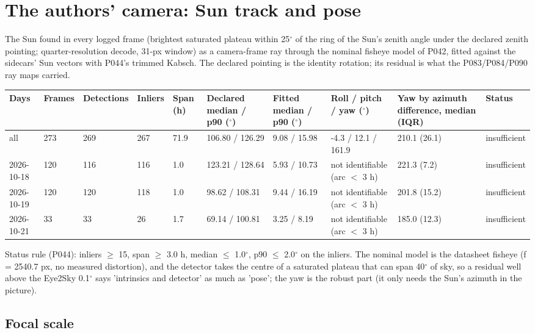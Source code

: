 \section{The authors' camera: Sun track and pose}

The Sun found in every logged frame (brightest saturated plateau within 25$^\circ$ of the ring of the Sun's zenith angle under the declared zenith pointing; quarter-resolution decode, 31-px window) as a camera-frame ray through the nominal fisheye model of P042, fitted against the sidecars' Sun vectors with P044's trimmed Kabsch. The declared pointing is the identity rotation; its residual is what the P083/P084/P090 ray maps carried.

\begin{center}{\tiny\setlength{\tabcolsep}{3pt}
\begin{tabular}{llllllllp{3.7cm}l}
\toprule
Days & Frames & Detections & Inliers & Span (h) & Declared median / p90 ($^\circ$) & Fitted median / p90 ($^\circ$) & Roll / pitch / yaw ($^\circ$) & Yaw by azimuth difference, median (IQR) & Status \\
\midrule
all & 273 & 269 & 267 & 71.9 & 106.80 / 126.29 & 9.08 / 15.98 & -4.3 / 12.1 / 161.9 & 210.1 (26.1) & insufficient \\
2026-10-18 & 120 & 116 & 116 & 1.0 & 123.21 / 128.64 & 5.93 / 10.73 & not identifiable (arc $<$ 3 h) & 221.3 (7.2) & insufficient \\
2026-10-19 & 120 & 120 & 118 & 1.0 & 98.62 / 108.31 & 9.44 / 16.19 & not identifiable (arc $<$ 3 h) & 201.8 (15.2) & insufficient \\
2026-10-21 & 33 & 33 & 26 & 1.7 & 69.14 / 100.81 & 3.25 / 8.19 & not identifiable (arc $<$ 3 h) & 185.0 (12.3) & insufficient \\
\bottomrule
\end{tabular}}
\end{center}

Status rule (P044): inliers $\geq$ 15, span $\geq$ 3.0 h, median $\leq$ 1.0$^\circ$, p90 $\leq$ 2.0$^\circ$ on the inliers. The nominal model is the datasheet fisheye (f = 2540.7 px, no measured distortion), and the detector takes the centre of a saturated plateau that can span 40$^\circ$ of sky, so a residual well above the Eye2Sky 0.1$^\circ$ says 'intrinsics and detector' as much as 'pose'; the yaw is the robust part (it only needs the Sun's azimuth in the picture).

\subsection{Focal scale}

